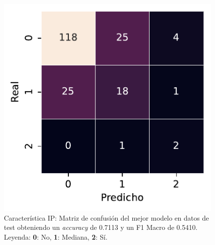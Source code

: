 \begin{figure}[htbp]
    \vspace{1.5em} %

    \includegraphics[width=0.6\linewidth]{figures/5_experiments/single-ip-cm.pdf}
    \caption[Característica IP: Matriz de confusión del mejor modelo en datos de test.]{Característica IP: Matriz de confusión del mejor modelo en datos de test obteniendo un \textit{accuracy} de 0.7113 y un F1 Macro de 0.5410. Leyenda: \textbf{0}: No, \textbf{1}: Mediana, \textbf{2}: Sí.}
    \label{fig5:IP_confusion_matrix}
\end{figure}

